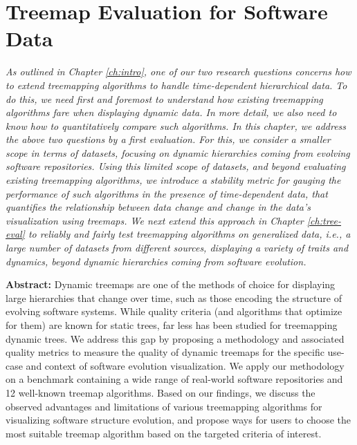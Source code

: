 \chapter{Treemap Evaluation for Software Data}
\label{ch:soft-eval}

\textit{
As outlined in Chapter \ref{ch:intro}, one of our two research questions concerns how to extend treemapping algorithms to handle time-dependent hierarchical data. To do this, we need first and foremost to understand how existing treemapping algorithms fare when displaying dynamic data. In more detail, we also need to know how to quantitatively compare such algorithms. In this chapter, we address the above two questions by a first evaluation. For this, we consider a smaller scope in terms of datasets, focusing on dynamic hierarchies coming from evolving software repositories. Using this limited scope of datasets, and beyond evaluating existing treemapping algorithms, we introduce a stability metric for gauging the performance of such algorithms in the presence of time-dependent data, that quantifies the relationship between data change and change in the data's visualization using treemaps. We next extend this approach in Chapter \ref{ch:tree-eval} to reliably and fairly test treemapping algorithms on generalized data, \emph{i.e.}, a large number of datasets from different sources, displaying a variety of traits and dynamics, beyond dynamic hierarchies coming from software evolution.}


\vspace{5mm} %

\noindent \textbf{Abstract:}
Dynamic treemaps are one of the methods of choice for displaying large hierarchies that change over time, such as those encoding the structure of evolving software systems. While quality criteria (and algorithms that optimize for them) are known for static trees, far less has been studied for treemapping dynamic trees. We address this gap by proposing a methodology and associated quality metrics to measure the quality of dynamic treemaps for the specific use-case and context of software evolution visualization. We apply our methodology on a benchmark containing a wide range of real-world software repositories and 12 well-known treemap algorithms. Based on our findings, we discuss the observed advantages and limitations of various treemapping algorithms for visualizing software structure evolution, and propose ways for users to choose the most suitable treemap algorithm based on the targeted criteria of interest.

